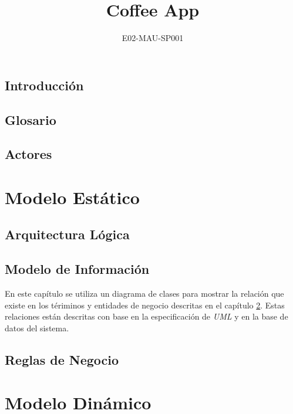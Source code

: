 \documentclass[11pt,twoside]{book}
\title{Coffee App}
\subtitle{E02-MAU-SP001}
\date{}
\begin{document}
	\maketitle
	\tableofcontents
	
	\newpage
	\projectCharter
	\firmas
	
	\chapter{Introducción}
	
	
	\chapter{Glosario}
	\label{ch:glosario}
	
	
	\chapter{Actores}
	\label{ch:actores}
	
	
	\part{Modelo Estático}
	
	\chapter{Arquitectura Lógica}
	\label{ch:arq}
	
	
	\chapter{Modelo de Información}
	\label{ch:modeloDeInformacion}
	En este capítulo se utiliza un diagrama de clases para mostrar la relación que existe en los tériminos y entidades de negocio descritas en el capítulo \ref{ch:glosario}. Estas relaciones están descritas con base en la especificación de \textit{UML} y en la base de datos del sistema.
	
	
	\chapter{Reglas de Negocio}
	\label{ch:reglas}
	
	
	\part{Modelo Dinámico}
	
\end{document}
